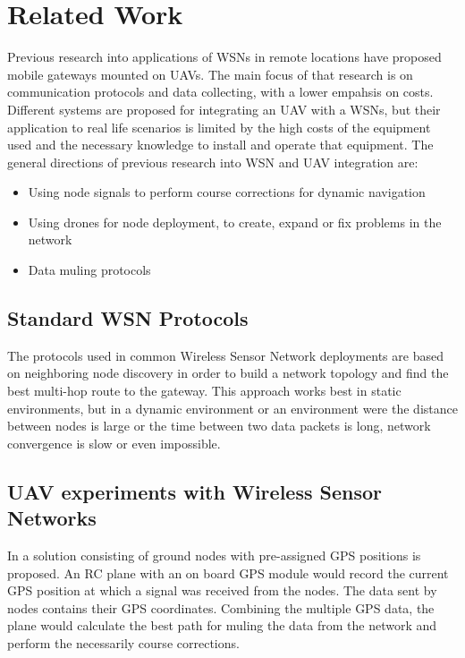 \normalfont\normalsize
\chapter{Related Work}
\label{chap:related}

Previous research into applications of WSNs in remote locations have proposed mobile gateways mounted on UAVs. The main focus of that research is on communication protocols and data collecting, with a lower empahsis on costs. Different systems are proposed for integrating an UAV with a WSNs, but their application to real life scenarios is limited by the high costs of the equipment used and the necessary knowledge to install and operate that equipment.
The general directions of previous research into WSN and UAV integration are:
\begin{itemize}

\item Using node signals to perform course corrections for dynamic navigation \cite{savarese2001location}
\item Using drones for node deployment, to create, expand or fix problems in the network \cite{akyildiz2002wireless}
\item Data muling protocols

\end{itemize}

\section{Standard WSN Protocols}

The protocols used in common Wireless Sensor Network deployments are based on neighboring node discovery in order to build a network topology and find the best multi-hop route to the gateway. This approach works best in static environments, but in a dynamic environment or an environment were the distance between nodes is large or the time between two data packets is long, network convergence is slow or even impossible.

\section{UAV experiments with Wireless Sensor Networks}

In \cite{teh2008experiments} a solution consisting of ground nodes with pre-assigned GPS positions is proposed. An RC plane with an on board GPS module would record the current GPS position at which a signal was received from the nodes. The data sent by nodes contains their GPS coordinates. Combining the multiple GPS data, the plane would calculate the best path for muling the data from the network and perform the necessarily course corrections.

